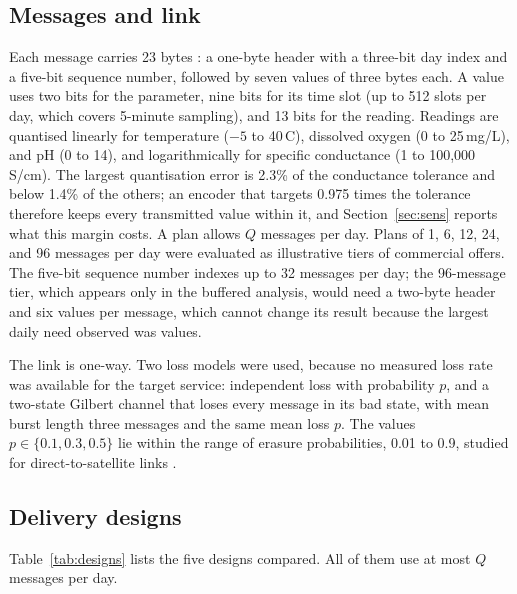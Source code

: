\subsection{Messages and link}
Each message carries 23 bytes \citep{kineis2023kim1}: a one-byte header with a three-bit day index and a five-bit sequence number, followed by seven values of three bytes each. A value uses two bits for the parameter, nine bits for its time slot (up to 512 slots per day, which covers 5-minute sampling), and 13 bits for the reading. Readings are quantised linearly for temperature ($-5$ to 40\,\textdegree C), dissolved oxygen (0 to 25\,mg/L), and pH (0 to 14), and logarithmically for specific conductance (1 to 100{,}000\,\textmu S/cm). The largest quantisation error is 2.3\% of the conductance tolerance and below 1.4\% of the others; an encoder that targets 0.975 times the tolerance therefore keeps every transmitted value within it, and Section~\ref{sec:sens} reports what this margin costs. A plan allows $Q$ messages per day. Plans of 1, 6, 12, 24, and 96 messages per day were evaluated as illustrative tiers of commercial offers. The five-bit sequence number indexes up to 32 messages per day; the 96-message tier, which appears only in the buffered analysis, would need a two-byte header and six values per message, which cannot change its result because the largest daily need observed was \needValMaxConf{} values.

The link is one-way. Two loss models were used, because no measured loss rate was available for the target service: independent loss with probability $p$, and a two-state Gilbert channel \citep{gilbert1960,elliott1963} that loses every message in its bad state, with mean burst length three messages and the same mean loss $p$. The values $p \in \{0.1, 0.3, 0.5\}$ lie within the range of erasure probabilities, 0.01 to 0.9, studied for direct-to-satellite links \citep{tondo2021}.

\subsection{Delivery designs}
Table~\ref{tab:designs} lists the five designs compared. All of them use at most $Q$ messages per day.

